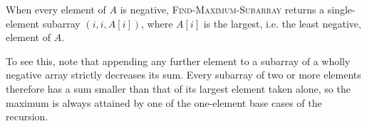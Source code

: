 When every element of $A$ is negative, \textsc{Find-Maximum-Subarray} returns a
single-element subarray $(i, i, A[i])$, where $A[i]$ is the largest, i.e. the
least negative, element of $A$.

To see this, note that appending any further element to a subarray of a wholly
negative array strictly decreases its sum. Every subarray of two or more
elements therefore has a sum smaller than that of its largest element taken
alone, so the maximum is always attained by one of the one-element base cases of
the recursion.
